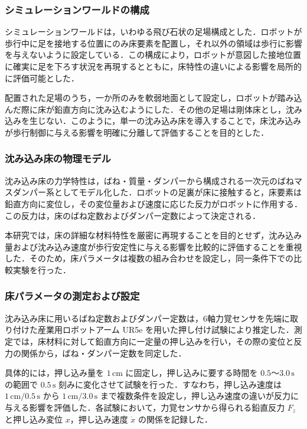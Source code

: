 \subsubsection{シミュレーションワールドの構成}

シミュレーションワールドは，いわゆる飛び石状の足場構成とした．ロボットが歩行中に足を接地する位置にのみ床要素を配置し，それ以外の領域は歩行に影響を与えないように設定している．この構成により，ロボットが意図した接地位置に確実に足を下ろす状況を再現するとともに，床特性の違いによる影響を局所的に評価可能とした．

配置された足場のうち，一か所のみを軟弱地面として設定し，ロボットが踏み込んだ際に床が鉛直方向に沈み込むようにした．その他の足場は剛体床とし，沈み込みを生じない．このように，単一の沈み込み床を導入することで，床沈み込みが歩行制御に与える影響を明確に分離して評価することを目的とした．

\subsubsection{沈み込み床の物理モデル}

沈み込み床の力学特性は，ばね・質量・ダンパーから構成される一次元のばねマスダンパー系としてモデル化した．ロボットの足裏が床に接触すると，床要素は鉛直方向に変位し，その変位量および速度に応じた反力がロボットに作用する．この反力は，床のばね定数およびダンパー定数によって決定される．

本研究では，床の詳細な材料特性を厳密に再現することを目的とせず，沈み込み量および沈み込み速度が歩行安定性に与える影響を比較的に評価することを重視した．そのため，床パラメータは複数の組み合わせを設定し，同一条件下での比較実験を行った．

\subsubsection{床パラメータの測定および設定}
\label{subsubsec:ground_param_identification}

沈み込み床に用いるばね定数およびダンパー定数は，6軸力覚センサを先端に取り付けた産業用ロボットアーム UR5e を用いた押し付け試験により推定した．測定では，床材料に対して鉛直方向に一定量の押し込みを行い，その際の変位と反力の関係から，ばね・ダンパー定数を同定した．

具体的には，押し込み量を $1\,\mathrm{cm}$ に固定し，押し込みに要する時間を $0.5$～$3.0\,\mathrm{s}$ の範囲で $0.5\,\mathrm{s}$ 刻みに変化させて試験を行った．すなわち，押し込み速度は $1\,\mathrm{cm}/0.5\,\mathrm{s}$ から $1\,\mathrm{cm}/3.0\,\mathrm{s}$ まで複数条件を設定し，押し込み速度の違いが反力に与える影響を評価した．各試験において，力覚センサから得られる鉛直反力 $F_z$ と押し込み変位 $x$，押し込み速度 $\dot{x}$ の関係を記録した．

